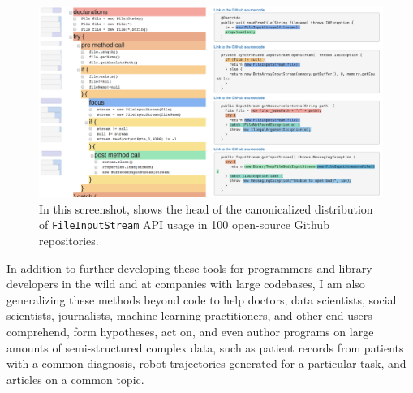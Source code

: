 \documentclass[justified]{tufte-handout}
\begin{document}
\begin{figure}[h]
  \includegraphics[width=0.65\linewidth]{Statistical_Code_Examples.png}
  \caption{In this screenshot,  shows the head of the canonicalized distribution of \texttt{FileInputStream} API usage in 100 open-source Github repositories.}%
  \label{fig:examplore}%
\end{figure}

In addition to further developing these tools for programmers and library developers in the wild and at companies with large codebases, I am also generalizing these methods beyond code to help doctors, data scientists, social scientists, journalists, machine learning practitioners, and other end-users comprehend, form hypotheses, act on, and even author programs on large amounts of semi-structured complex data, such as patient records from patients with a common diagnosis, robot trajectories generated for a particular task, and articles on a common topic.%


\end{document}

